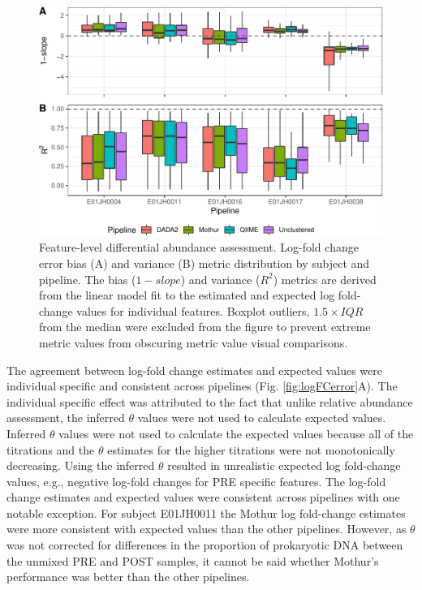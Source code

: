 \documentclass[linenumbers]{bmcart}
\begin{document}
\begin{figure}
\centering
\includegraphics{logFcErrorMetrics-1.pdf}
\caption{\label{fig:logFcErrorMetrics}Feature-level differential abundance assessment. Log-fold change error
bias (A) and variance (B) metric distribution by subject and pipeline.
The bias (\(1 - slope\)) and variance (\(R^2\)) metrics are derived from
the linear model fit to the estimated and expected log fold-change
values for individual features. Boxplot outliers, \(1.5\times IQR\) from
the median were excluded from the figure to prevent extreme metric
values from obscuring metric value visual comparisons.}
\end{figure}

The agreement between log-fold change estimates and expected values were
individual specific and consistent across pipelines (Fig.
\ref{fig:logFCerror}A). The individual specific effect was attributed to
the fact that unlike relative abundance assessment, the inferred
\(\theta\) values were not used to calculate expected values. Inferred
\(\theta\) values were not used to calculate the expected values because
all of the titrations and the \(\theta\) estimates for the higher
titrations were not monotonically decreasing.
Using the inferred \(\theta\) resulted in unrealistic expected log fold-change values, e.g.,
negative log-fold changes for PRE specific features. The log-fold change
estimates and expected values were consistent across pipelines with one
notable exception. For subject E01JH0011 the Mothur log fold-change estimates
were more consistent with expected values than the other pipelines.
However, as \(\theta\) was not corrected for differences in the
proportion of prokaryotic DNA between the unmixed PRE and POST samples,
it cannot be said whether Mothur's performance was better than the other
pipelines.
\end{document}
